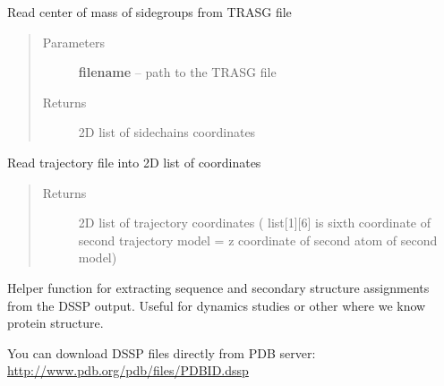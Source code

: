 \documentclass[letterpaper,10pt,english]{sphinxmanual}
\begin{document}
\begin{fulllineitems}
\label{api:pycabs.loadSGCoordinates}
Read center of mass of sidegroups from TRASG file
\begin{quote}\begin{description}
\item[{Parameters}] \leavevmode
\textbf{filename} -- path to the TRASG file

\item[{Returns}] \leavevmode
2D list of sidechains coordinates

\end{description}\end{quote}

\end{fulllineitems}


\begin{fulllineitems}
\label{api:pycabs.loadTRAFCoordinates}
Read trajectory file into 2D list of coordinates
\begin{quote}\begin{description}
\item[{Returns}] \leavevmode
2D list of trajectory coordinates ( list{[}1{]}{[}6{]} is sixth coordinate of second trajectory model = z coordinate of second atom of second model)

\end{description}\end{quote}

\end{fulllineitems}


\begin{fulllineitems}
\label{api:pycabs.parseDSSPOutput}
Helper function for extracting sequence and secondary structure assignments from the DSSP output. Useful for dynamics studies or other where we know protein structure.

You can download DSSP files directly from PDB server: \href{http://www.pdb.org/pdb/files/PDBID.dssp}{http://www.pdb.org/pdb/files/PDBID.dssp}

\end{fulllineitems}
\end{document}
